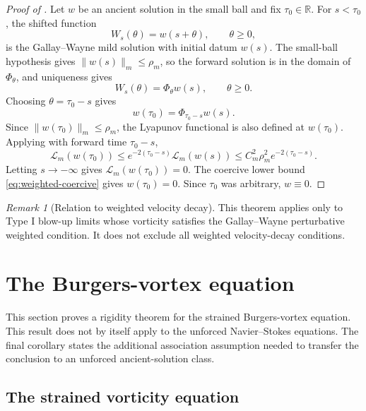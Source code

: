 \documentclass[11pt]{amsart}
\theoremstyle{plain}
\theoremstyle{definition}
\theoremstyle{remark}
\newtheorem{remark}[theorem]{Remark}
\numberwithin{equation}{section}
\begin{document}
\begin{proof}[Proof of ]
Let \(w\) be an ancient solution in the small ball and fix
\(\tau_0\in\mathbb R\).  For \(s<\tau_0\), the shifted function
\[
   W_s(\theta)=w(s+\theta),\qquad \theta\ge0,
\]
is the Gallay--Wayne mild solution with initial datum \(w(s)\).  The small-ball
hypothesis gives \(\|w(s)\|_m\le\rho_m\), so the forward solution is in the
domain of \(\Phi_\theta\), and uniqueness gives
\[
   W_s(\theta)=\Phi_\theta w(s),\qquad \theta\ge0.
\]
Choosing \(\theta=\tau_0-s\) gives
\[
   w(\tau_0)=\Phi_{\tau_0-s}w(s).
\]
Since \(\|w(\tau_0)\|_m\le\rho_m\), the Lyapunov functional is also defined at
\(w(\tau_0)\).  Applying  with forward time
\(\tau_0-s\),
\[
   \mathcal L_m(w(\tau_0))
   \le
   e^{-2(\tau_0-s)}\mathcal L_m(w(s))
   \le
   C_m^2\rho_m^2e^{-2(\tau_0-s)} .
\]
Letting \(s\to-\infty\) gives \(\mathcal L_m(w(\tau_0))=0\).  The coercive
lower bound \eqref{eq:weighted-coercive} gives \(w(\tau_0)=0\).  Since
\(\tau_0\) was arbitrary, \(w\equiv0\).
\end{proof}

\begin{remark}[Relation to weighted velocity decay]
This theorem applies only to Type I blow-up limits whose
vorticity satisfies the Gallay--Wayne perturbative weighted condition.  It does
not exclude all weighted velocity-decay conditions.
\end{remark}

\section{The Burgers-vortex equation}
\label{sec:burgers}

This section proves a rigidity theorem for the strained Burgers-vortex equation.
This result does not by itself apply to the unforced Navier--Stokes equations.  The
final corollary states the additional association assumption needed to transfer
the conclusion to an unforced ancient-solution class.

\subsection{The strained vorticity equation}
\end{document}
